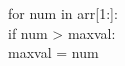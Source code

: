 \documentclass[preview]{standalone}
\begin{document}
for num in arr[1:]:\\if num > maxval:\\maxval = num\\
\end{document}
